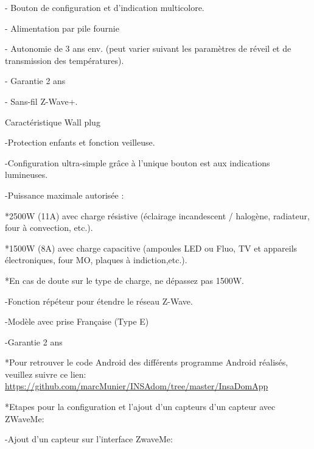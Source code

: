 -    Bouton de configuration et d'indication multicolore.


-    Alimentation par pile fournie 


-    Autonomie de 3 ans env. (peut varier suivant les paramètres de réveil et de transmission des températures).


-    Garantie 2 ans


-    Sans-fil Z-Wave+.


Caractéristique Wall plug



-Protection enfants et fonction veilleuse.


-Configuration ultra-simple grâce à l'unique bouton est aux indications lumineuses.


-Puissance maximale autorisée :

    *2500W (11A) avec charge résistive (éclairage incandescent / halogène, radiateur, four à convection, etc.).
    

    *1500W (8A) avec charge capacitive (ampoules LED ou Fluo, TV et appareils électroniques, four MO, plaques à indiction,etc.).
    
    
    *En cas de doute sur le type de charge, ne dépassez pas 1500W.


-Fonction répéteur pour étendre le réseau Z-Wave.


-Modèle avec prise Française (Type E)


-Garantie 2 ans 

*Pour retrouver le code Android des différents programme Android réalisés, veuillez suivre ce lien:  \url{https://github.com/marcMunier/INSAdom/tree/master/InsaDomApp}


*Etapes pour la configuration et l'ajout d'un capteurs d'un capteur avec ZWaveMe:


-Ajout d'un capteur sur l'interface ZwaveMe:



